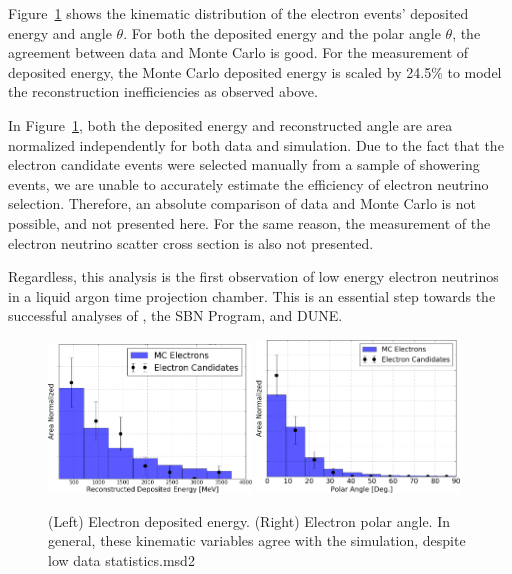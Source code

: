 Figure~\ref{fig:electron_kinematics} shows the kinematic distribution of the electron events' deposited energy and angle $\theta$.  For both the deposited energy and the polar angle $\theta$, the agreement between data and Monte Carlo is good.  For the measurement of deposited energy, the Monte Carlo deposited energy is scaled by 24.5\% to model the reconstruction inefficiencies as observed above.

In Figure~\ref{fig:electron_kinematics}, both the deposited energy and reconstructed angle are area normalized independently for both data and simulation.  Due to the fact that the electron candidate events were selected manually from a sample of showering events, we are unable to accurately estimate the efficiency of electron neutrino selection.  Therefore, an absolute comparison of data and Monte Carlo is not possible, and not presented here.  For the same reason, the measurement of the electron neutrino scatter cross section is also not presented.

Regardless, this analysis is the first observation of low energy electron neutrinos in a liquid argon time projection chamber.  This is an essential step towards the successful analyses of \uboone, the SBN Program, and DUNE.


\begin{figure}[htbp]
  \centering
  \includegraphics[width=0.48\textwidth]{emshower_figures/depE_corrected_trimmed.png}
  \includegraphics[width=0.48\textwidth]{emshower_figures/angle_comparison_trimmed.png}
  \caption{(Left) Electron deposited energy. (Right) Electron polar angle.  In general, these kinematic variables agree with the simulation, despite low data statistics.msd2}
  \label{fig:electron_kinematics}
\end{figure}

